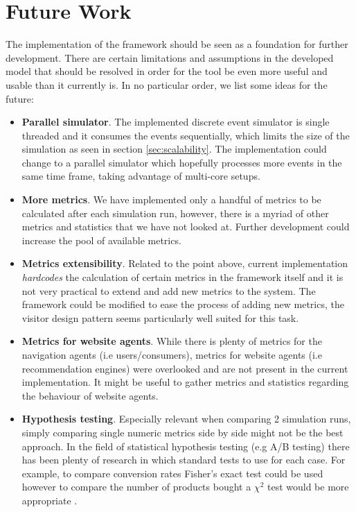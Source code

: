 \section{Future Work}

The implementation of the framework should be seen as a foundation for further 
development. There are certain limitations and assumptions in the developed 
model that should be resolved in order for the tool be even more useful and 
usable than it currently is. In no particular order, we list some ideas for the 
future:

\begin{itemize}
    \item \textbf{Parallel simulator}. The implemented discrete event simulator 
    is single threaded and it consumes the events sequentially, which limits 
    the size of the simulation as seen in section \ref{sec:scalability}. The 
    implementation could change to a parallel simulator which hopefully 
    processes more events in the same time frame, taking advantage of 
    multi-core setups.
    
    \item \textbf{More metrics}. We have implemented only a handful of metrics 
    to be calculated after each simulation run, however, there is a myriad of 
    other metrics and statistics that we have not looked at. Further 
    development could increase the pool of available metrics.
    
    \item \textbf{Metrics extensibility}. Related to the point above, current 
    implementation \textit{hardcodes} the calculation of certain metrics in the 
    framework itself and it is not very practical to extend and add new metrics 
    to the system. The framework could be modified to ease the process of 
    adding new metrics, the visitor design pattern\cite{gamma1995design} seems 
    particularly well suited for this task.
    
    \item \textbf{Metrics for website agents}. While there is plenty of metrics 
    for the navigation agents (i.e users/consumers), metrics for website agents 
    (i.e recommendation engines) were overlooked and are not present in the 
    current implementation. It might be useful to gather metrics and statistics 
    regarding the behaviour of website agents.
    
    \item \textbf{Hypothesis testing}. Especially relevant when comparing 2 
    simulation runs, simply comparing single numeric metrics side by side might 
    not be the best approach. In the field of statistical hypothesis testing 
    (e.g A/B testing) there has been plenty of research in which standard tests 
    to use for each case. For example, to compare conversion rates Fisher's 
    exact test could be used however to compare the number of products bought a 
    $\chi^2$ test would be more appropriate \cite{wikiab}.
    

\end{itemize}

